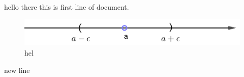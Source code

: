 \documentclass[12pt]{article}
\begin{document}
    hello there this is first line of document.\\
    \begin{figure}[h]
        \centering
        \includegraphics{1.png}
        \caption{hel}
        \label{hel}
    \end{figure}
    new line\\
    \begin{frame}
    
    
    \end{frame}
\end{document}
